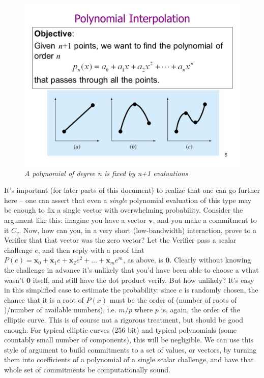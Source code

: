 \documentclass[10pt,a4paper]{article}
\begin{document}
\begin{figure}[h]
\raggedright
\includegraphics[scale=0.5]{images/PolynomialInterpolation.jpg}
\caption{\emph{A polynomial of degree n is fixed by n+1 evaluations}}
\end{figure}
It's important (for later parts of this document) to realize that one
can go further here -- one can assert that even a \emph{single}
polynomial evaluation of this type may be enough to fix a single vector
with overwhelming probability. Consider the argument like this: imagine
you have a vector $\mathbf{v}$, and you make a commitment to it $C_v$. Now, how can you,
in a very short (low-bandwidth) interaction, prove to a Verifier that
that vector was the zero vector? Let the Verifier pass a scalar
challenge $e$, and then reply with a proof that $P(e) = \mathbf{x}_0 + \mathbf{x}_1e + \mathbf{x}_2e^2 + \ldots + \mathbf{x}_me^m$, as above, is $\mathbf{0}$. Clearly
without knowing the challenge in advance it's unlikely that you'd have
been able to choose a $\mathbf{v}$that wasn't $\mathbf{0}$ itself, and still have the dot product
verify. But how unlikely? It's easy in this simplified case to estimate
the probability: since $e$ is randomly chosen, the chance that it is a root
of $P(x)$ must be the order of (number of roots of )/number of available
numbers), i.e. $m/p$ where $p$ is, again, the order of the elliptic curve. This is
of course not a rigorous treatment, but should be good enough. For
typical elliptic curves (256 bit) and typical polynomials (some
countably small number of components), this will be negligible. We can
use this style of argument to build commitments to a set of values, or
vectors, by turning them into coefficients of a polynomial of a single
scalar challenge, and have that whole set of commitments be
computationally sound.
\end{document}
